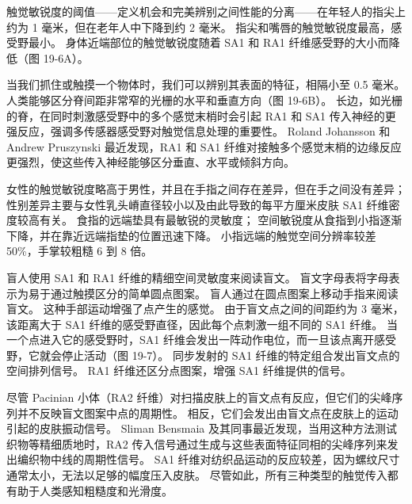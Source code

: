 触觉敏锐度的阈值——定义机会和完美辨别之间性能的分离——在年轻人的指尖上约为 1 毫米，但在老年人中下降到约 2 毫米。 指尖和嘴唇的触觉敏锐度最高，感受野最小。 身体近端部位的触觉敏锐度随着 SA1 和 RA1 纤维感受野的大小而降低（图 19-6A）。

当我们抓住或触摸一个物体时，我们可以辨别其表面的特征，相隔小至 0.5 毫米。 人类能够区分脊间距非常窄的光栅的水平和垂直方向（图 19-6B）。 长边，如光栅的脊，在同时刺激感受野中的多个感觉末梢时会引起 RA1 和 SA1 传入神经的更强反应，强调多传感器感受野对触觉信息处理的重要性。 Roland Johansson 和 Andrew Pruszynski 最近发现，RA1 和 SA1 纤维对接触多个感觉末梢的边缘反应更强烈，使这些传入神经能够区分垂直、水平或倾斜方向。

女性的触觉敏锐度略高于男性，并且在手指之间存在差异，但在手之间没有差异； 性别差异主要与女性乳头嵴直径较小以及由此导致的每平方厘米皮肤 SA1 纤维密度较高有关。 食指的远端垫具有最敏锐的灵敏度； 空间敏锐度从食指到小指逐渐下降，并在靠近远端指垫的位置迅速下降。 小指远端的触觉空间分辨率较差 50\%，手掌较粗糙 6 到 8 倍。

盲人使用 SA1 和 RA1 纤维的精细空间灵敏度来阅读盲文。 盲文字母表将字母表示为易于通过触摸区分的简单圆点图案。 盲人通过在圆点图案上移动手指来阅读盲文。 这种手部运动增强了点产生的感觉。 由于盲文点之间的间距约为 3 毫米，该距离大于 SA1 纤维的感受野直径，因此每个点刺激一组不同的 SA1 纤维。 当一个点进入它的感受野时，SA1 纤维会发出一阵动作电位，而一旦该点离开感受野，它就会停止活动（图 19-7）。 同步发射的 SA1 纤维的特定组合发出盲文点的空间排列信号。 RA1 纤维还区分点图案，增强 SA1 纤维提供的信号。

尽管 Pacinian 小体（RA2 纤维）对扫描皮肤上的盲文点有反应，但它们的尖峰序列并不反映盲文图案中点的周期性。 相反，它们会发出由盲文点在皮肤上的运动引起的皮肤振动信号。 Sliman Bensmaia 及其同事最近发现，当用这种方法测试织物等精细质地时，RA2 传入信号通过生成与这些表面特征同相的尖峰序列来发出编织物中线的周期性信号。 SA1 纤维对纺织品运动的反应较差，因为螺纹尺寸通常太小，无法以足够的幅度压入皮肤。 尽管如此，所有三种类型的触觉传入都有助于人类感知粗糙度和光滑度。



